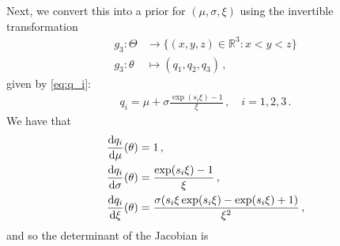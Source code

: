 \documentclass{article}
\newcommand{\R}{\mathbb{R}}
\newcommand{\dd}{{\rm d}}
\begin{document}
%
Next, we convert this into a prior for $(\mu, \sigma, \xi)$
using the invertible transformation
%
\begin{align*}
	g_3 \colon \Theta &\to \{(x, y, z) \in \R^3 \colon x < y < z\} \\
	g_3 \colon \theta &\mapsto (q_{1}, q_{2}, q_{3}) \,,
\end{align*}
%
given by \eqref{eq:q_i}:
%
\begin{align*}
	q_i = \mu + \sigma \frac{\exp(s_i \xi) - 1}{\xi} \,, \quad i = 1, 2, 3 \,.
\end{align*}
%
We have that
%
\begin{align}
	\frac{\dd q_{i}}{\dd \mu}(\theta)
		&= 1 \,,
	\label{eq:q_i-derivatives-1} \\
	\frac{\dd q_{i}}{\dd \sigma}(\theta)
		&= \frac{\exp(s_i \xi) - 1}{\xi} \,,\\
	\frac{\dd q_{i}}{\dd \xi}(\theta)
		&= \frac{\sigma(s_i \xi \exp(s_i \xi) -\exp(s_i \xi) + 1)}{\xi ^ 2} \,,
	\label{eq:q_i-derivatives-2}
\end{align}
%
and so the determinant of the Jacobian is
%
\end{document}
